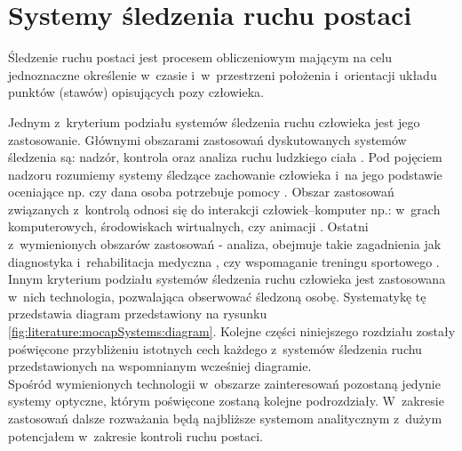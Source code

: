 \section{Systemy śledzenia ruchu postaci} \label{sec:literature:mocapSystems}

Śledzenie ruchu postaci jest procesem obliczeniowym mającym na celu jednoznaczne określenie w~czasie i~w~przestrzeni położenia i~orientacji układu punktów (stawów) opisujących pozy człowieka. 

Jednym z~kryterium podziału systemów śledzenia ruchu człowieka jest jego zastosowanie. Głównymi obszarami zastosowań dyskutowanych systemów śledzenia są: nadzór, kontrola oraz analiza ruchu ludzkiego ciała \cite{Moeslund2001}. Pod pojęciem nadzoru rozumiemy systemy śledzące zachowanie człowieka i~na jego podstawie oceniające np. czy dana osoba potrzebuje pomocy \cite{Kwolek, Kepski2016, Haritaoglu}. Obszar zastosowań związanych z~kontrolą odnosi się do interakcji człowiek--komputer np.: w~grach komputerowych, środowiskach wirtualnych, czy animacji \cite{Moeslund2001a}. Ostatni z~wymienionych obszarów zastosowań - analiza, obejmuje takie zagadnienia jak diagnostyka i~rehabilitacja medyczna \cite{Even-zohar1984,XsensRehab}, czy wspomaganie treningu sportowego \cite{Neville2010,Noiumkar2013,inmotio}.\\

Innym kryterium podziału systemów śledzenia ruchu człowieka jest zastosowana w~nich technologia, pozwalająca obserwować śledzoną osobę. Systematykę tę przedstawia diagram przedstawiony na rysunku \ref{fig:literature:mocapSystems:diagram}. Kolejne części niniejszego rozdziału zostały poświęcone przybliżeniu istotnych cech każdego z~systemów śledzenia ruchu przedstawionych na wspomnianym wcześniej diagramie. \\

Spośród wymienionych technologii w~obszarze zainteresowań pozostaną jedynie systemy optyczne, którym poświęcone zostaną kolejne podrozdziały. W~zakresie zastosowań dalsze rozważania będą najbliższe systemom analitycznym z~dużym potencjałem w~zakresie kontroli ruchu postaci.

